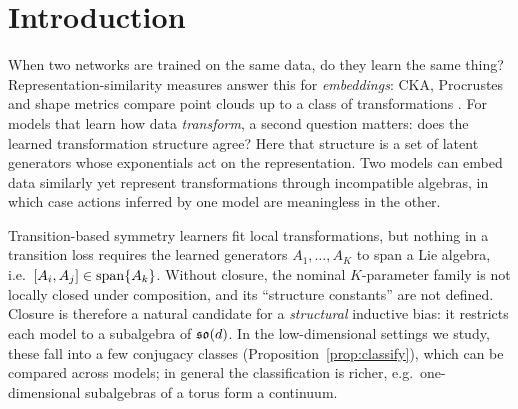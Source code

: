 \section{Introduction}\label{sec:intro}
When two networks are trained on the same data, do they learn the same thing? Representation-similarity measures
answer this for \emph{embeddings}: CKA, Procrustes and shape metrics compare point clouds up to a class of
transformations \citep{kornblith2019similarity,williams2021generalized}. For models that learn how data
\emph{transform}, a second question matters: does the learned transformation structure agree? Here that structure
is a set of latent generators whose exponentials act on the representation. Two models can embed data similarly
yet represent transformations through incompatible algebras, in which case actions inferred by one model are
meaningless in the other.

Transition-based symmetry learners \citep{park2022learning,keurti2023homomorphism,yang2024latent} fit local
transformations, but nothing in a transition loss requires the learned generators $A_1,\dots,A_K$ to span a Lie
algebra, i.e.\ $[A_i,A_j]\in\operatorname{span}\{A_k\}$. Without closure, the nominal $K$-parameter family is not locally closed
under composition, and its ``structure constants'' are not defined. Closure is therefore a natural candidate for a
\emph{structural} inductive bias: it restricts each model to a subalgebra of $\mathfrak{so}(d)$. In the low-dimensional settings
we study, these fall into a few conjugacy classes (Proposition~\ref{prop:classify}), which can be compared across
models; in general the classification is richer, e.g.\ one-dimensional subalgebras of a torus form a continuum.

